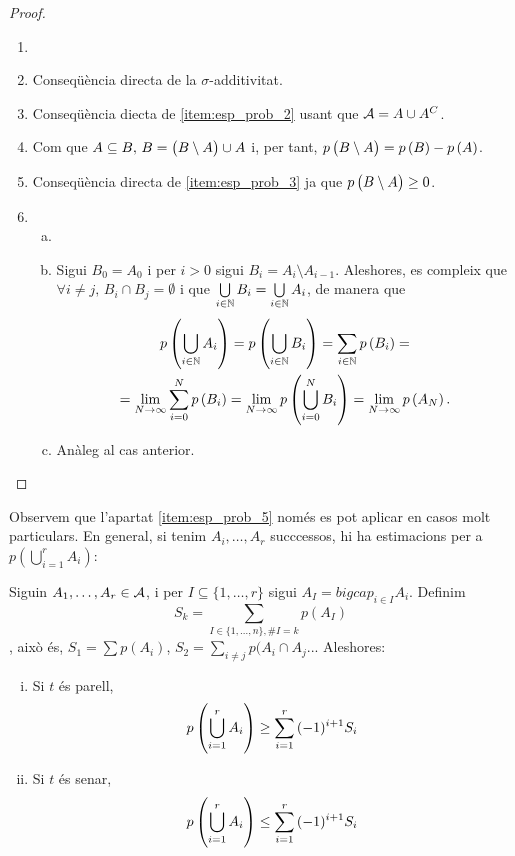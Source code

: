 \begin{proof}
    \begin{enumerate}
        \item[]
        \item Conseqüència directa de la $\sigma$-additivitat.
        \item Conseqüència diecta de \ref{item:esp_prob_2} usant que $\mathcal{A} = A\cup A^C$.
        \item Com que $A\subseteq B,\, B=\left( B\setminus A\right) \cup A$ i, per tant, $p\left( B\setminus A \right) = p\left( B\right) - p\left( A\right)$.
        \item Conseqüència directa de \ref{item:esp_prob_3} ja que $p\left( B\setminus A\right)\geq 0$.
        \item 
        \begin{enumerate}[a)]
            \item[]
            \item Sigui $B_0=A_0$ i per $i>0$ sigui $B_i = A_i\setminus A_{i-1}$. Aleshores, es compleix que $\forall i\neq j, \, B_i \cap B_j =\emptyset$ i que $\bigcup\limits_{i\in \mathbb{N}} B_i = \bigcup\limits_{i\in\mathbb{N}} A_i$, de manera que
            \begin{gather*}
                p\left(\bigcup\limits_{i\in\mathbb{N}} A_i\right) = p\left(\bigcup\limits_{i\in\mathbb{N}} B_i\right) = \sum\limits_{i\in\mathbb{N}} p\left( B_i\right) =\\
                = \lim\limits_{N\to\infty} \sum_{i=0}^N p\left( B_i\right) = \lim\limits_{N\to\infty} p\left( \bigcup_{i=0}^N B_i\right) = \lim\limits_{N\to\infty} p\left( A_N\right).
            \end{gather*}
            \item Anàleg al cas anterior.
        \end{enumerate}
    \end{enumerate}
\end{proof}

Observem que l'apartat \ref{item:esp_prob_5} només es pot aplicar en casos molt particulars. En general, si tenim $A_i,\dots,A_r$ succcessos,
hi ha estimacions per a $p(\bigcup_{i=1}^{r}{A_i})$:

\begin{teo}
    Siguin $A_1,\dots,A_r\in\mathcal{A}$, i per $I\subseteq\{1,\dots,r\}$ sigui $A_I = bigcap_{i \in I}{A_i}$. Definim
    \[
        S_k = \sum_{I \in \{1,\dots,n\},\#I=k}{p(A_I)}
    \],
    això és, $S_1 = \sum{p(A_i)}$, $S_2 = \sum_{i \neq j}{p(A_i \cap A_j}$... Aleshores:
    \begin{enumerate}[i)]
         \item Si $t$ és parell,
            \[p\left(\bigcup_{i=1}^{r}{A_i}\right) \geq \sum_{i=1}^{r}{(-1)^{i+1}S_i}\]
         \item Si $t$ és senar,
            \[p\left(\bigcup_{i=1}^{r}{A_i}\right) \leq \sum_{i=1}^{r}{(-1)^{i+1}S_i}\]
    \end{enumerate}
\end{teo}

